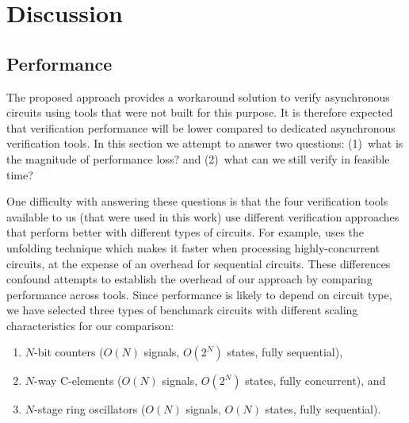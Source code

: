 

\section{Discussion}

\vspace{0.2cm}

\subsection{Performance}

The proposed approach provides a workaround solution to verify asynchronous
circuits using tools that were not built for this purpose. It is therefore
expected that verification performance will be lower compared to dedicated
asynchronous verification tools. In this section we attempt to answer two
questions: (1)~what is the magnitude of performance loss? and (2)~what can we
still verify in feasible time?

One difficulty with answering these questions is that the four verification
tools available to us (that were used in this work) use different verification
approaches that perform better with different types of circuits. For example,
\mpsat{} uses the unfolding technique \cite{khomenko2003model} which makes it
faster when processing highly-concurrent circuits, at the expense of an
overhead for sequential circuits. These differences confound attempts to
establish the overhead of our approach by comparing performance across tools.
Since performance is likely to depend on circuit type, we have selected three
types of benchmark circuits with different scaling characteristics for our
comparison:

\vspace{0.2cm}

\begin{enumerate}
\item $N$-bit counters ($O(N)$ signals, $O(2^N)$ states, fully
sequential),
\item $N$-way C-elements ($O(N)$ signals, $O(2^N)$ states, fully
concurrent), and
\item $N$-stage ring oscillators ($O(N)$ signals, $O(N)$
states, fully sequential).
\end{enumerate}

\vspace{0.2cm}

